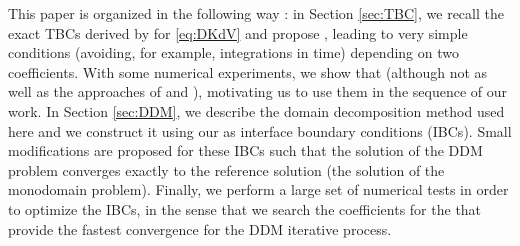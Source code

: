 \indent This paper is organized in the following way : in Section \ref{sec:TBC}, we recall the exact TBCs derived by \cite{zheng2008} for \eqref{eq:DKdV} and propose  , leading to very simple  conditions (avoiding, for example, integrations in time) depending on two coefficients. With some numerical experiments, we show that   (although not as well as the approaches of \cite{zheng2008} and \cite{besse2015}), motivating us to use them in the sequence of our work. In Section \ref{sec:DDM}, we describe the domain decomposition method used here and we construct it using our   as interface boundary conditions (IBCs). Small modifications are proposed for these IBCs such that the solution of the DDM problem converges exactly to the reference solution (the solution of the monodomain problem). Finally, we perform a large set of numerical tests in order to optimize the IBCs, in the sense that we search the coefficients for the  that provide the fastest convergence for the DDM iterative process.